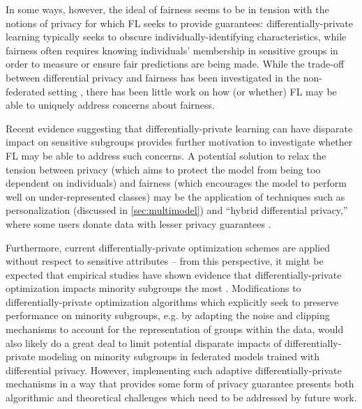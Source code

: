 \documentclass[11pt]{article}
\begin{document}
In some ways, however, the ideal of fairness seems to be in tension with the notions of privacy for which FL seeks to provide guarantees: differentially-private learning typically seeks to obscure individually-identifying characteristics, while fairness often requires knowing individuals' membership in sensitive groups in order to measure or ensure fair predictions are being made. While the trade-off between differential privacy and fairness has been investigated in the non-federated setting \cite{jagielski2018privatefair, CGKM19}, there has been little work on how (or whether) FL may be able to uniquely address concerns about fairness. 

Recent evidence suggesting that differentially-private learning can have disparate impact on sensitive subgroups \cite{bagdasaryan2019disparate, CGKM19, jagielski2018privatefair, kuppam2019fair} provides further motivation to investigate whether FL may be able to address such concerns. A potential solution to relax the tension between privacy (which aims to protect the model from being too dependent on individuals) and fairness (which encourages the model to perform well on under-represented classes) may be the application of techniques such as personalization (discussed in \cref{sec:multimodel}) and ``hybrid differential privacy,'' where some users donate data with lesser privacy guarantees \cite{avent2017blender}. 

Furthermore, current differentially-private optimization schemes are applied without respect to sensitive attributes -- from this perspective, it might be expected that empirical studies have shown evidence that differentially-private optimization impacts minority subgroups the most \cite{bagdasaryan2019disparate}. Modifications to differentially-private optimization algorithms which explicitly seek to preserve performance on minority subgroups, e.g. by adapting the noise and clipping mechanisms to account for the representation of groups within the data, would also likely do a great deal to limit potential disparate impacts of differentially-private modeling on minority subgroups in federated models trained with differential privacy. However, implementing such adaptive differentially-private mechanisms in a way that provides some form of privacy guarantee presents both algorithmic and theoretical challenges which need to be addressed by future work. 
\end{document}
